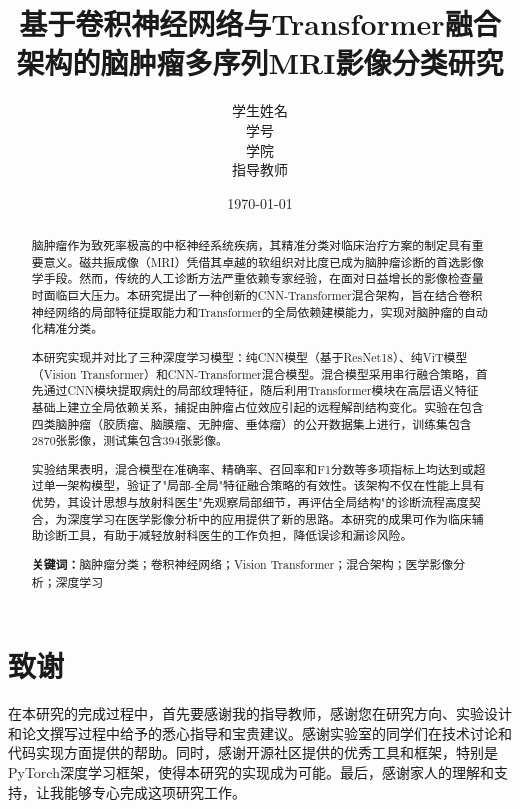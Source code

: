 \documentclass[12pt, a4paper]{article}
\title{\textbf{基于卷积神经网络与Transformer融合架构的脑肿瘤多序列MRI影像分类研究}}
\author{学生姓名\\
        学号\\
        学院\\
        指导教师}
\date{\today}
\begin{document}
\maketitle

\begin{abstract}
脑肿瘤作为致死率极高的中枢神经系统疾病，其精准分类对临床治疗方案的制定具有重要意义。磁共振成像（MRI）凭借其卓越的软组织对比度已成为脑肿瘤诊断的首选影像学手段。然而，传统的人工诊断方法严重依赖专家经验，在面对日益增长的影像检查量时面临巨大压力。本研究提出了一种创新的CNN-Transformer混合架构，旨在结合卷积神经网络的局部特征提取能力和Transformer的全局依赖建模能力，实现对脑肿瘤的自动化精准分类。

本研究实现并对比了三种深度学习模型：纯CNN模型（基于ResNet18）、纯ViT模型（Vision Transformer）和CNN-Transformer混合模型。混合模型采用串行融合策略，首先通过CNN模块提取病灶的局部纹理特征，随后利用Transformer模块在高层语义特征基础上建立全局依赖关系，捕捉由肿瘤占位效应引起的远程解剖结构变化。实验在包含四类脑肿瘤（胶质瘤、脑膜瘤、无肿瘤、垂体瘤）的公开数据集上进行，训练集包含2870张影像，测试集包含394张影像。

实验结果表明，混合模型在准确率、精确率、召回率和F1分数等多项指标上均达到或超过单一架构模型，验证了"局部-全局"特征融合策略的有效性。该架构不仅在性能上具有优势，其设计思想与放射科医生"先观察局部细节，再评估全局结构"的诊断流程高度契合，为深度学习在医学影像分析中的应用提供了新的思路。本研究的成果可作为临床辅助诊断工具，有助于减轻放射科医生的工作负担，降低误诊和漏诊风险。

\textbf{关键词：}脑肿瘤分类；卷积神经网络；Vision Transformer；混合架构；医学影像分析；深度学习
\end{abstract}

\newpage
\tableofcontents
\newpage











\section*{致谢}
在本研究的完成过程中，首先要感谢我的指导教师，感谢您在研究方向、实验设计和论文撰写过程中给予的悉心指导和宝贵建议。感谢实验室的同学们在技术讨论和代码实现方面提供的帮助。同时，感谢开源社区提供的优秀工具和框架，特别是PyTorch深度学习框架，使得本研究的实现成为可能。最后，感谢家人的理解和支持，让我能够专心完成这项研究工作。



\end{document}
